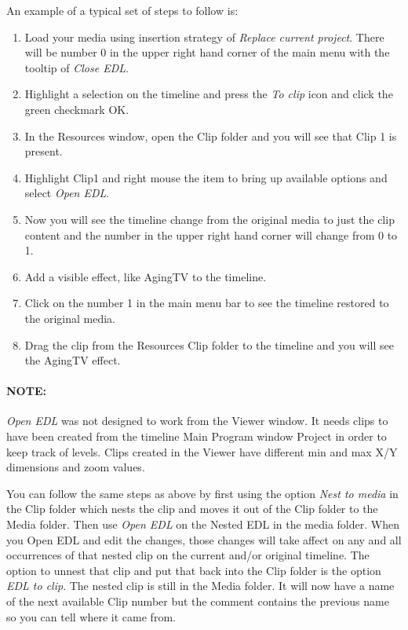 An example of a typical set of steps to follow is:
\begin{enumerate}
	\item Load your media using insertion strategy of \textit{Replace
		current project}.  There will be number 0 in the upper right hand corner
	of the main menu with the tooltip of \textit{Close EDL}.
	\item Highlight a selection on the timeline and press the
	\textit{To clip} icon and click the green checkmark OK.
	\item In the Resources window, open the Clip folder and you will
	see that Clip 1 is present.
	\item Highlight Clip1 and right mouse the item to bring up
	available options and select \textit{Open EDL}.
	\item Now you will see the timeline change from the original
	media to just the clip content and the number in the upper right hand
	corner will change from 0 to 1.
	\item Add a visible effect, like AgingTV to the timeline.
	\item Click on the number 1 in the main menu bar to see the timeline
	restored to the original media.
	\item Drag the clip from the Resources Clip folder to the
	timeline and you will see the AgingTV effect.
\end{enumerate}

\paragraph{NOTE:} \textit{Open EDL} was not designed to work from the Viewer window. It needs clips to have been created from the timeline Main Program window Project in order to keep track of levels. Clips created in the Viewer have different min and max X/Y dimensions and zoom values.

You can follow the same steps as above by first using the option
\textit{Nest to media} in the Clip folder which nests the clip and
moves it out of the Clip folder to the Media folder.  Then use
\textit{Open EDL} on the Nested EDL  in the media folder.  When you
Open EDL and edit the changes, those changes will take affect on any
and all occurrences of that nested clip on the current and/or
original timeline. The option to unnest that clip and put that back
into the Clip folder is the option \textit{EDL to clip}.  The nested
clip is still in the Media folder.  It will now have a name of the
next available Clip number but the comment contains the previous name so
you can tell where it came from.

